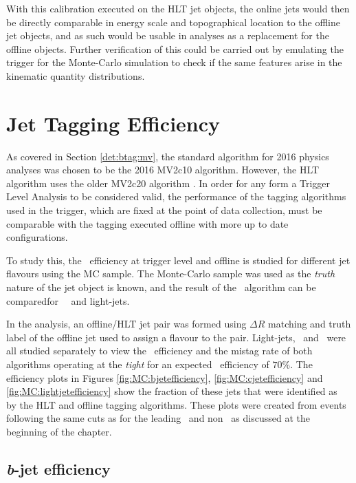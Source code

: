 		With this calibration executed on the HLT jet objects, the online jets would then be directly comparable in energy scale and topographical location to the offline jet objects, and as such would be usable in analyses as a replacement for the offline objects. Further verification of this could be carried out by emulating the trigger for the Monte-Carlo simulation to check if the same features arise in the kinematic quantity distributions.

\section{Jet Tagging Efficiency}

	As covered in Section  \ref{det:btag:mv}, the standard algorithm for 2016 physics analyses was chosen to be the 2016 MV2c10 algorithm. However, the HLT \btag\, algorithm uses the older MV2c20 algorithm \cite{trig2015}. In order for any form a Trigger Level Analysis to be considered valid, the performance of the tagging algorithms used in the trigger, which are fixed at the point of data collection, must be comparable with the tagging executed offline with more up to date \btag\, configurations.

	To study this, the \btag\, efficiency at trigger level and offline is studied for different jet flavours using the MC sample. The Monte-Carlo sample was used as the \textit{truth} nature of the jet object is known, and the result of the \btag\, algorithm can be comparedfor \bjets\, \cjets\, and light-jets.

	In the analysis, an offline/HLT jet pair was formed using $\Delta R$ matching and truth label of the offline jet used to assign a flavour to the pair. Light-jets, \bjets\, and \cjets\, were all studied separately to view the \btag\, efficiency and the mistag rate of both algorithms operating at the \textit{tight} for an expected \btag\ efficiency of $70\%$. The efficiency plots in Figures \ref{fig:MC:bjetefficiency}, \ref{fig:MC:cjetefficiency} and \ref{fig:MC:lightjetefficiency} show the fraction of these jets that were identified as \bjets\, by the HLT and offline tagging algorithms. These plots were created from events following the same cuts as for the leading \bjet\ and non \bjet\ as discussed at the beginning of the chapter.

	\subsection{\textit{b}-jet efficiency}
	\label{obp:beff}

